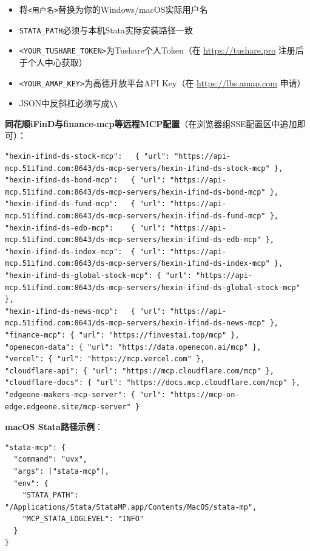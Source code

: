 \begin{warningbox}[路径与凭证替换提醒]
\begin{itemize}[leftmargin=1em]
  \item 将\texttt{<用户名>}替换为你的Windows/macOS实际用户名
  \item \texttt{STATA\_PATH}必须与本机Stata实际安装路径一致
  \item \texttt{<YOUR\_TUSHARE\_TOKEN>}为Tushare个人Token（在 \url{https://tushare.pro} 注册后于个人中心获取）
  \item \texttt{<YOUR\_AMAP\_KEY>}为高德开放平台API Key（在 \url{https://lbs.amap.com} 申请）
  \item JSON中反斜杠必须写成\texttt{\textbackslash\textbackslash}
\end{itemize}
\end{warningbox}

\textbf{同花顺iFinD与finance-mcp等远程MCP配置}（在浏览器组SSE配置区中追加即可）：

\begin{lstlisting}[style=json]
"hexin-ifind-ds-stock-mcp":   { "url": "https://api-mcp.51ifind.com:8643/ds-mcp-servers/hexin-ifind-ds-stock-mcp" },
"hexin-ifind-ds-bond-mcp":   { "url": "https://api-mcp.51ifind.com:8643/ds-mcp-servers/hexin-ifind-ds-bond-mcp" },
"hexin-ifind-ds-fund-mcp":   { "url": "https://api-mcp.51ifind.com:8643/ds-mcp-servers/hexin-ifind-ds-fund-mcp" },
"hexin-ifind-ds-edb-mcp":    { "url": "https://api-mcp.51ifind.com:8643/ds-mcp-servers/hexin-ifind-ds-edb-mcp" },
"hexin-ifind-ds-index-mcp":  { "url": "https://api-mcp.51ifind.com:8643/ds-mcp-servers/hexin-ifind-ds-index-mcp" },
"hexin-ifind-ds-global-stock-mcp": { "url": "https://api-mcp.51ifind.com:8643/ds-mcp-servers/hexin-ifind-ds-global-stock-mcp" },
"hexin-ifind-ds-news-mcp":   { "url": "https://api-mcp.51ifind.com:8643/ds-mcp-servers/hexin-ifind-ds-news-mcp" },
"finance-mcp": { "url": "https://finvestai.top/mcp" },
"openecon-data": { "url": "https://data.openecon.ai/mcp" },
"vercel": { "url": "https://mcp.vercel.com" },
"cloudflare-api": { "url": "https://mcp.cloudflare.com/mcp" },
"cloudflare-docs": { "url": "https://docs.mcp.cloudflare.com/mcp" },
"edgeone-makers-mcp-server": { "url": "https://mcp-on-edge.edgeone.site/mcp-server" }
\end{lstlisting}

\textbf{macOS Stata路径示例}：

\begin{lstlisting}[style=json]
"stata-mcp": {
  "command": "uvx",
  "args": ["stata-mcp"],
  "env": {
    "STATA_PATH": "/Applications/Stata/StataMP.app/Contents/MacOS/stata-mp",
    "MCP_STATA_LOGLEVEL": "INFO"
  }
}
\end{lstlisting}

